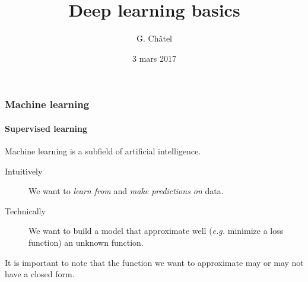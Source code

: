 \documentclass[9pt]{beamer}
\title{Deep learning basics}
\author{G. Châtel}
\date{3 mars 2017}
\begin{document}
\begin{frame}

  \maketitle

\end{frame}

\begin{frame}

  \frametitle{Machine learning}

  \framesubtitle{Supervised learning}

  Machine learning is a subfield of artificial intelligence.

  \bigskip

  \begin{description}
    \item[Intuitively] We want to \emph{learn from} and \emph{make predictions
    on} data.

    \item[Technically] We want to build a model that approximate well
      (\textit{e.g.} minimize a loss function) an unknown function.
  \end{description}

  \bigskip 

  It is important to note that the function we want to approximate may
  or may not have a closed form.
\end{frame}
\end{document}
